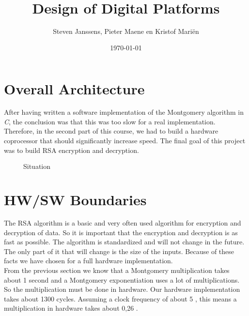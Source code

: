 \documentclass[a4paper]{article}
\title{Design of Digital Platforms}
\author{Steven Janssens, Pieter Maene en Kristof Mari\"en}
\date{\today}
\begin{document}
\maketitle

\section{Overall Architecture}

After having written a software implementation of the Montgomery algorithm in \textit{C}, the conclusion was that this was too slow for a real implementation. Therefore, in the second part of this course, we had to build a hardware coprocessor that should significantly increase speed. The final goal of this project was to build RSA encryption and decryption.\\

\begin{figure}[h]
	\caption{Situation}
	\label{fig:situation}
\end{figure}

\section{HW/SW Boundaries}

The RSA algorithm is a basic and very often used algorithm for encryption and decryption of data. So it is important that the encryption and decryption is as fast as possible. The algorithm is standardized and will not change in the future. The only part of it that will change is the size of the inputs. Because of these facts we have chosen for a full hardware implementation.\\

From the previous section we know that a Montgomery multiplication takes about 1 second and a Montgomery exponentiation uses a lot of multiplications. So the multiplication must be done in hardware. Our hardware implementation takes about 1300 cycles. Assuming a clock frequency of about 5 \mega \hertz, this means a multiplication in hardware takes about 0,26 \micro \second.\\
\end{document}
